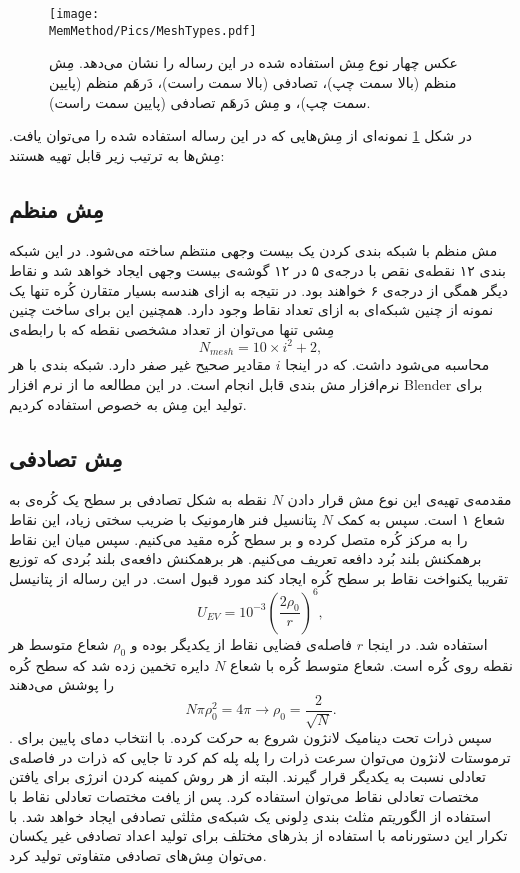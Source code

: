 \begin{figure}[h]
\begin{center}
\texttt{[image: \\MemMethod/Pics/MeshTypes.pdf]}
\caption{
عکس چهار نوع مِش استفاده شده در این رساله را نشان می‌دهد. مِش منظم (بالا سمت چپ)، تصادفی (بالا سمت راست)، دَرهَم منظم (پایین سمت چپ)، و مِش دَرهَم تصادفی (پایین سمت راست).
}
\label{fig:meshTypesMesthod}
\end{center}
\end{figure}
در شکل
\ref{fig:meshTypesMesthod}
نمونه‌ای از مِش‌هایی که در این رساله استفاده شده را می‌توان یافت. مِش‌ها به ترتیب زیر قابل تهیه هستند:
\subsection{
مِش منظم
}
مش منظم با شبکه‌ بندی کردن یک بیست وجهی منتظم ساخته می‌شود. در این شبکه‌ بندی ۱۲ نقطه‌ی نقص با درجه‌ی ۵ در ۱۲ گوشه‌ی بیست وجهی ایجاد خواهد شد و نقاط دیگر همگی از درجه‌ی ۶ خواهند بود. در نتیجه به ازای هندسه بسیار متقارن کُره تنها یک نمونه از چنین شبکه‌ای به ازای تعداد نقاط وجود دارد. همچنین این برای ساخت چنین مِشی تنها می‌توان از تعداد مشخصی نقطه که با رابطه‌ی 
\begin{equation}
N_{mesh}=10\times i^2+2,
\end{equation}
محاسبه می‌شود داشت.  که در اینجا 
$i$
مقادیر صحیح غیر صفر دارد. ‌شبکه‌ بندی با هر نرم‌افزار مش بندی قابل انجام است. در این مطالعه ما از نرم افزار 
Blender
برای تولید این مِش به خصوص استفاده کردیم. 

\subsection{
مِش تصادفی
}
مقدمه‌ی تهیه‌ی این نوع مش  قرار دادن 
$N$
نقطه به شکل تصادفی بر سطح یک کُره‌ی به شعاع ۱ است. سپس به کمک 
$N$
پتانسیل فنر هارمونیک با ضریب سختی زیاد، این نقاط را به مرکز کُره متصل کرده و بر سطح کُره مقید می‌کنیم. سپس میان این نقاط برهمکنش بلند بُرد دافعه تعریف می‌کنیم. هر برهمکنش دافعه‌ی بلند بُردی که  توزیع تقریبا یکنواخت نقاط بر سطح کُره ایجاد کند مورد قبول است. در این رساله از پتانیسل 
\begin{equation}
U_{EV}=10^{-3}\left(\frac{2\rho_0}{r}\right)^6,
\end{equation}
استفاده شد. در اینجا 
$r$
فاصله‌ی فضایی نقاط از یکدیگر بوده و 
$\rho_0$
شعاع متوسط هر نقطه روی کُره است. شعاع متوسط کُره با شعاع 
$N$
دایره تخمین زده شد که  سطح کُره را پوشش می‌دهند
\begin{equation}
N\pi\rho_0^2=4\pi\rightarrow \rho_0=\frac{2}{\sqrt{N}}.
\end{equation} 
. سپس ذرات تحت دینامیک لانژون شروع به حرکت کرده. با انتخاب دمای پایین برای ترموستات لانژون می‌توان سرعت ذرات را پله پله کم کرد تا جایی که ذرات در فاصله‌ی تعادلی نسبت به یکدیگر قرار گیرند. البته از هر روش کمینه کردن انرژی
برای یافتن مختصات تعادلی نقاط می‌توان استفاده کرد. پس از یافت مختصات تعادلی نقاط با استفاده از الگوریتم مثلث‌ بندی دِلونی
\cite{DelaunayTriangulation1997}
یک شبکه‌ی مثلثی تصادفی ایجاد خواهد شد. با تکرار این دستورنامه با استفاده از بذر‌های
 مختلف برای تولید اعداد تصادفی غیر یکسان می‌توان مِش‌های تصادفی متفاوتی تولید کرد.

